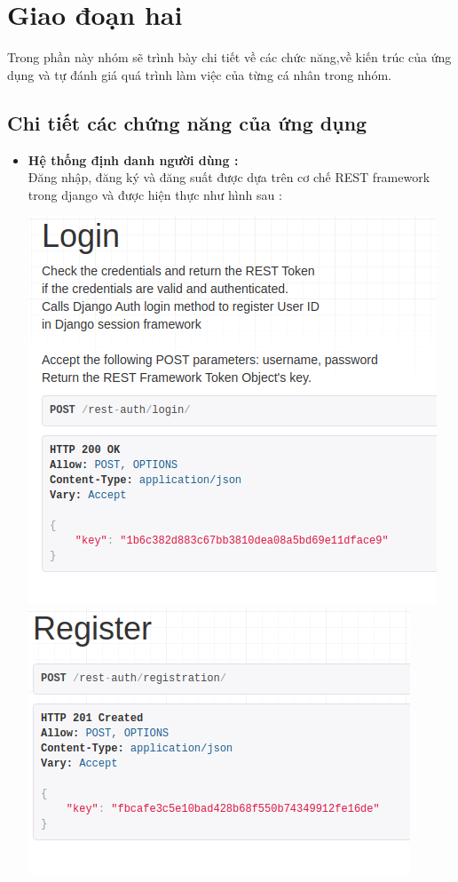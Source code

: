 \documentclass[a4paper]{article}
\begin{document}
	

\section{Giao đoạn hai}\label{giai_doan_2}
Trong phần này nhóm sẽ trình bày chi tiết về các chức năng,về kiến trúc của ứng dụng và tự đánh giá quá trình làm việc của từng cá nhân trong nhóm. 
	\subsection{Chi tiết các chứng năng của ứng dụng}  
	\begin{itemize}
		\item \textbf{Hệ thống định danh người dùng :} \\
		Đăng nhập, đăng ký và đăng suất được dựa trên cơ chế REST framework trong django và được hiện thực như hình sau : 
			\begin{center}
					\includegraphics[scale=0.7]{Images/login.png}
					\includegraphics[width=.6\linewidth]{Images/signup.png}

\end{center}
\end{itemize}
\end{document}

